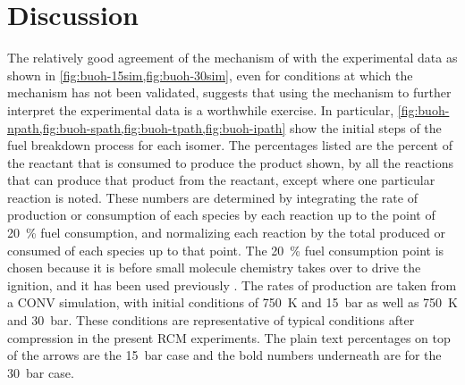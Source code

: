 \documentclass[../main.tex]{subfiles}
\begin{document}
\section{Discussion}
\label{sec:buoh-discussion}

The relatively good agreement of the mechanism of \textcite{Sarathy2012} with
the experimental data as shown in \cref{fig:buoh-15sim,fig:buoh-30sim},
even for conditions at which the mechanism has not been
validated, suggests that using the mechanism to further interpret the
experimental data is a worthwhile exercise. In particular,
\cref{fig:buoh-npath,fig:buoh-spath,fig:buoh-tpath,fig:buoh-ipath}
show the initial steps of the fuel breakdown process for each isomer.
The percentages listed are the percent of the reactant that is consumed
to produce the product shown, by all the reactions that can produce
that product from the reactant, except where one particular reaction
is noted. These numbers are determined by integrating the
rate of production or consumption of each species by each reaction up to the
point of \SI{20}{\percent} fuel consumption, and normalizing each reaction by the total
produced or consumed of each species up to that point. The \SI{20}{\percent} fuel
consumption point is chosen because it is before small molecule chemistry takes
over to drive the ignition, and it has been used previously
\cite{Weber2011,Sarathy2012}. The rates of production are taken from a CONV
simulation, with initial conditions of \SI{750}{\kelvin} and \SI{15}{\bar} as well as \SI{750}{\kelvin} and
\SI{30}{\bar}. These conditions are representative of typical conditions after compression
in the present RCM experiments. The plain text percentages on top of the arrows
are the \SI{15}{\bar} case and the bold numbers underneath are for the \SI{30}{\bar} case.
\end{document}
